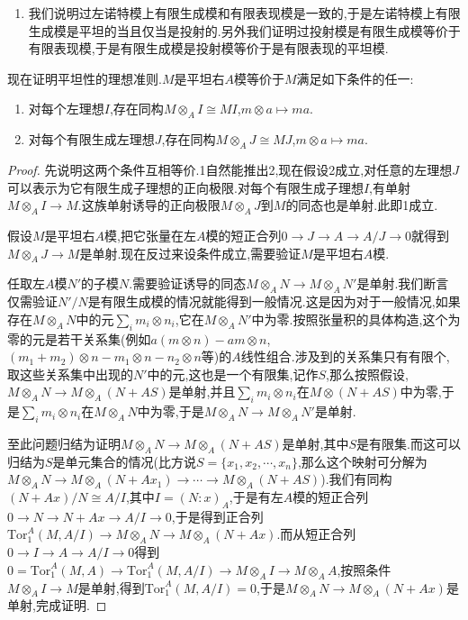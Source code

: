 \begin{enumerate}
\begin{proof}
		按照$A\to A''$是满同态,得到$(A'')^*\to A^*$是单同态,于是从$B$平坦得到第一行是正合列.于是第一行的正合性传递给第二行.即$\mathrm{Hom}_R(B,A'')^*\to\mathrm{Hom}_R(B,A)^*$是单同态,于是$\mathrm{Hom}_R(B,A)\to\mathrm{Hom}_R(B,A'')$是满同态,这就得证.
	\end{proof}
	\item 我们说明过左诺特模上有限生成模和有限表现模是一致的,于是左诺特模上有限生成模是平坦的当且仅当是投射的.另外我们证明过投射模是有限生成模等价于有限表现模,于是有限生成模是投射模等价于是有限表现的平坦模.
\end{enumerate}

现在证明平坦性的理想准则.$M$是平坦右$A$模等价于$M$满足如下条件的任一:
\begin{enumerate}
	\item 对每个左理想$I$,存在同构$M\otimes_AI\cong MI$,$m\otimes a\mapsto ma$.
	\item 对每个有限生成左理想$J$,存在同构$M\otimes_AJ\cong MJ$,$m\otimes a\mapsto ma$.
\end{enumerate}
\begin{proof}
	
	先说明这两个条件互相等价.1自然能推出2,现在假设2成立,对任意的左理想$J$可以表示为它有限生成子理想的正向极限.对每个有限生成子理想$I$,有单射$M\otimes_AI\to M$.这族单射诱导的正向极限$M\otimes_AJ$到$M$的同态也是单射.此即1成立.
	
	假设$M$是平坦右$A$模,把它张量在左$A$模的短正合列$0\to J\to A\to A/J\to0$就得到$M\otimes_AJ\to M$是单射.现在反过来设条件成立,需要验证$M$是平坦右$A$模.
	
	任取左$A$模$N'$的子模$N$.需要验证诱导的同态$M\otimes_AN\to M\otimes_AN'$是单射.我们断言仅需验证$N'/N$是有限生成模的情况就能得到一般情况.这是因为对于一般情况,如果存在$M\otimes_AN$中的元$\sum_im_i\otimes n_i$,它在$M\otimes_AN'$中为零.按照张量积的具体构造,这个为零的元是若干关系集(例如$a(m\otimes n)-am\otimes n$,$(m_1+m_2)\otimes n-m_1\otimes n-n_2\otimes n$等)的$A$线性组合.涉及到的关系集只有有限个,取这些关系集中出现的$N'$中的元,这也是一个有限集,记作$S$,那么按照假设,$M\otimes_AN\to M\otimes_A(N+AS)$是单射,并且$\sum_im_i\otimes n_i$在$M\otimes(N+AS)$中为零,于是$\sum_im_i\otimes n_i$在$M\otimes_AN$中为零,于是$M\otimes_AN\to M\otimes_AN'$是单射.
	
	至此问题归结为证明$M\otimes_AN\to M\otimes_A(N+AS)$是单射,其中$S$是有限集.而这可以归结为$S$是单元集合的情况(比方说$S=\{x_1,x_2,\cdots,x_n\}$,那么这个映射可分解为$M\otimes_AN\to M\otimes_A(N+Ax_1)\to\cdots\to M\otimes_A(N+AS)$).我们有同构$(N+Ax)/N\cong A/I$,其中$I=(N:x)_A$,于是有左$A$模的短正合列$0\to N\to N+Ax\to A/I\to0$,于是得到正合列$\mathrm{Tor}_1^A(M,A/I)\to M\otimes_AN\to M\otimes_A(N+Ax)$.而从短正合列$0\to I\to A\to A/I\to0$得到$0=\mathrm{Tor}_1^A(M,A)\to\mathrm{Tor}_1^A(M,A/I)\to M\otimes_AI\to M\otimes_AA$,按照条件$M\otimes_AI\to M$是单射,得到$\mathrm{Tor}_1^A(M,A/I)=0$,于是$M\otimes_AN\to M\otimes_A(N+Ax)$是单射,完成证明.
\end{proof}

